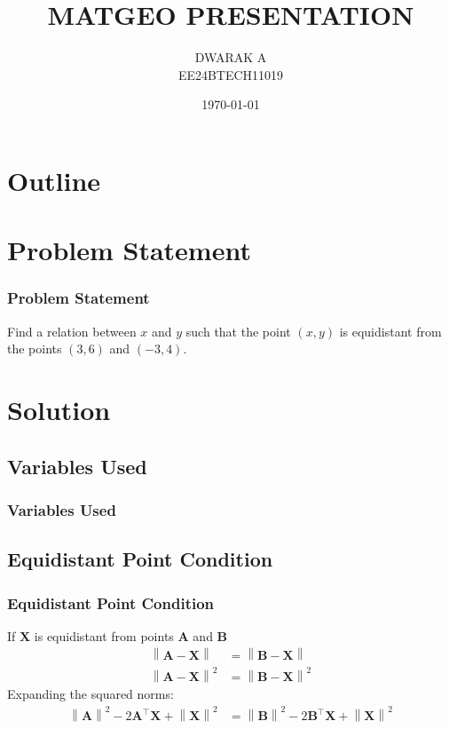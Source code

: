 \documentclass{beamer}
\title{MATGEO PRESENTATION}
\author{DWARAK A\\EE24BTECH11019}
\date{\today}
\theoremstyle{remark}
\providecommand{\norm}[1]{\left\lVert#1\right\rVert}
\let\vec\mathbf
\numberwithin{equation}{section}
\begin{document}
\begin{frame}
\titlepage
\end{frame}

\section*{Outline}
\begin{frame}
\tableofcontents
\end{frame}

\section{Problem Statement}
\begin{frame}
\frametitle{Problem Statement}
Find a relation between $x$ and $y$ such that the point $(x, y)$ is equidistant from the points $(3, 6)$ and $(-3, 4)$.
\end{frame}

\section{Solution}
\subsection{Variables Used}
\begin{frame}
    \frametitle{Variables Used}
    \begin{table}[H]    
  \centering
  
\end{table}
\end{frame}

\subsection{Equidistant Point Condition}
\begin{frame}
\frametitle{Equidistant Point Condition}

If $\vec{X}$ is equidistant from points $\vec{A}$ and $\vec{B}$
\begin{align}
	\norm{\vec{A} - \vec{X}} &= \norm{\vec{B} - \vec{X}} \\
	\norm{\vec{A} - \vec{X}}^2 &= \norm{\vec{B} - \vec{X}}^2
\end{align}
Expanding the squared norms:
\begin{align}
	\norm{\vec{A}}^2 - 2\vec{A}^\top \vec{X} + \norm{\vec{X}}^2 &= \norm{\vec{B}}^2 - 2\vec{B}^\top \vec{X} + \norm{\vec{X}}^2 \\
\end{align}
\end{frame}
\end{document}
